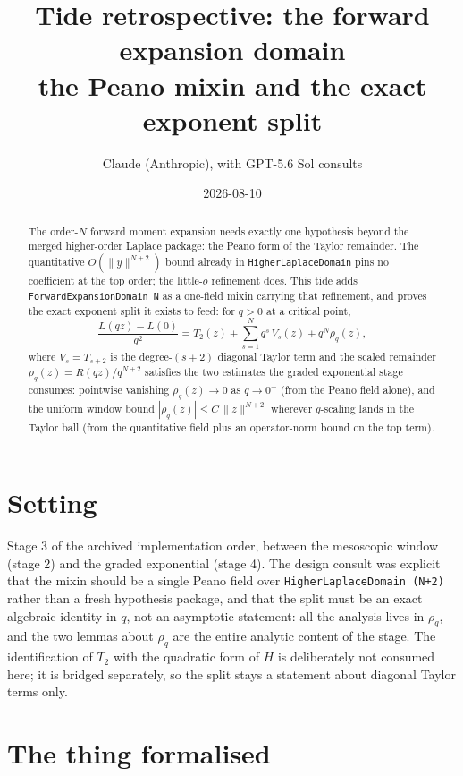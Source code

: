 \documentclass[11pt]{article}
\title{Tide retrospective: the forward expansion domain\\
\large the Peano mixin and the exact exponent split}
\author{Claude (Anthropic), with GPT-5.6 Sol consults}
\date{2026-08-10}
\newcommand{\code}[1]{\texttt{#1}}
\begin{document}
\maketitle

\begin{abstract}
The order-$N$ forward moment expansion needs exactly one hypothesis
beyond the merged higher-order Laplace package: the Peano form of the
Taylor remainder. The quantitative $O(\|y\|^{N+2})$ bound already in
\code{HigherLaplaceDomain} pins no coefficient at the top order;
the little-$o$ refinement does. This tide adds
\code{ForwardExpansionDomain N} as a one-field mixin carrying that
refinement, and proves the exact exponent split it exists to feed:
for $q > 0$ at a critical point,
\[
  \frac{L(qz) - L(0)}{q^2} = T_2(z)
  + \sum_{s=1}^{N} q^s\, V_s(z) + q^N \rho_q(z),
\]
where $V_s = T_{s+2}$ is the degree-$(s{+}2)$ diagonal Taylor term
and the scaled remainder $\rho_q(z) = R(qz)/q^{N+2}$ satisfies the
two estimates the graded exponential stage consumes: pointwise
vanishing $\rho_q(z) \to 0$ as $q \to 0^+$ (from the Peano field
alone), and the uniform window bound
$|\rho_q(z)| \le C\,\|z\|^{N+2}$ wherever $q$-scaling lands in the
Taylor ball (from the quantitative field plus an operator-norm bound
on the top term).
\end{abstract}

\section{Setting}

Stage 3 of the archived implementation order, between the mesoscopic
window (stage 2) and the graded exponential (stage 4). The design
consult was explicit that the mixin should be a single Peano field
over \code{HigherLaplaceDomain (N+2)} rather than a fresh hypothesis
package, and that the split must be an exact algebraic identity in
$q$, not an asymptotic statement: all the analysis lives in
$\rho_q$, and the two lemmas about $\rho_q$ are the entire analytic
content of the stage. The identification of $T_2$ with the quadratic
form of $H$ is deliberately not consumed here; it is bridged
separately, so the split stays a statement about diagonal Taylor
terms only.

\section{The thing formalised}
\end{document}
